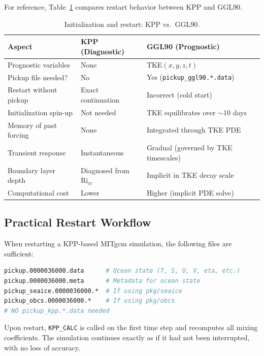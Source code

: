 \documentclass[12pt,letterpaper]{article}
\begin{document}
For reference, Table~\ref{tab:kpp_ggl90_restart} compares restart behavior
between KPP and GGL90.

\begin{table}[h!]
\centering
\caption{Initialization and restart: KPP vs.\ GGL90.}
\label{tab:kpp_ggl90_restart}
\begin{tabular}{@{}lll@{}}
\toprule
\textbf{Aspect} & \textbf{KPP (Diagnostic)} & \textbf{GGL90 (Prognostic)} \\
\midrule
Prognostic variables & None & TKE$(x,y,z,t)$ \\
Pickup file needed? & No & Yes (\texttt{pickup\_ggl90.*.data}) \\
Restart without pickup & Exact continuation & Incorrect (cold start) \\
Initialization spin-up & Not needed & TKE equilibrates over $\sim$10 days \\
Memory of past forcing & None & Integrated through TKE PDE \\
Transient response & Instantaneous & Gradual (governed by TKE timescales) \\
Boundary layer depth & Diagnosed from $\text{Ri}_{\text{cr}}$ & Implicit in TKE decay scale \\
Computational cost & Lower & Higher (implicit PDE solve) \\
\bottomrule
\end{tabular}
\end{table}

\subsection{Practical Restart Workflow}

When restarting a KPP-based MITgcm simulation, the following files are sufficient:

\begin{lstlisting}[language=bash, caption={Typical restart file list for KPP simulation.}]
pickup.0000036000.data      # Ocean state (T, S, U, V, eta, etc.)
pickup.0000036000.meta      # Metadata for ocean state
pickup_seaice.0000036000.*  # If using pkg/seaice
pickup_obcs.0000036000.*    # If using pkg/obcs
# NO pickup_kpp.*.data needed
\end{lstlisting}

Upon restart, \texttt{KPP\_CALC} is called on the first time step and recomputes
all mixing coefficients. The simulation continues exactly as if it had not been
interrupted, with no loss of accuracy.
\end{document}
